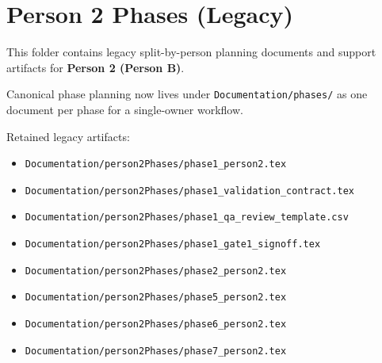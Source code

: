\documentclass{article}
\begin{document}
\section*{Person 2 Phases (Legacy)}

This folder contains legacy split-by-person planning documents and
support artifacts for \textbf{Person 2 (Person B)}.

Canonical phase planning now lives under \texttt{Documentation/phases/}
as one document per phase for a single-owner workflow.

Retained legacy artifacts:
\begin{itemize}
\item \texttt{Documentation/person2Phases/phase1\_person2.tex}
\item \texttt{Documentation/person2Phases/phase1\_validation\_contract.tex}
\item \texttt{Documentation/person2Phases/phase1\_qa\_review\_template.csv}
\item \texttt{Documentation/person2Phases/phase1\_gate1\_signoff.tex}
\item \texttt{Documentation/person2Phases/phase2\_person2.tex}
\item \texttt{Documentation/person2Phases/phase5\_person2.tex}
\item \texttt{Documentation/person2Phases/phase6\_person2.tex}
\item \texttt{Documentation/person2Phases/phase7\_person2.tex}
\end{itemize}
\end{document}
